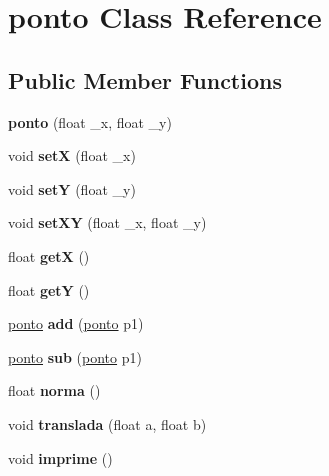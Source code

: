 \hypertarget{classponto}{}\section{ponto Class Reference}
\label{classponto}
\subsection*{Public Member Functions}
\begin{DoxyCompactItemize}
\item 
\mbox{\label{classponto_a6d6d40e6c14e903c65c48988b65fb649}} 
{\bfseries ponto} (float \+\_\+x, float \+\_\+y)
\item 
\mbox{\label{classponto_a64ff8ce435f3626995f535671a21403d}} 
void {\bfseries setX} (float \+\_\+x)
\item 
\mbox{\label{classponto_acf9918cb8a31b1f74e7425acee366322}} 
void {\bfseries setY} (float \+\_\+y)
\item 
\mbox{\label{classponto_a29ac118d16c126d9d13ae8daff2f13cf}} 
void {\bfseries set\+XY} (float \+\_\+x, float \+\_\+y)
\item 
\mbox{\label{classponto_a72028c7500c56c02b7574ca2cff8a6b2}} 
float {\bfseries getX} ()
\item 
\mbox{\label{classponto_a880c3bd815e15edd0130c77d33a57c7c}} 
float {\bfseries getY} ()
\item 
\mbox{\label{classponto_abbb3e8c2c0c74fba6c52e1b2c5ebfb76}} 
\hyperlink{classponto}{ponto} {\bfseries add} (\hyperlink{classponto}{ponto} p1)
\item 
\mbox{\label{classponto_ac2e219ffd3a478a4326792452c0af734}} 
\hyperlink{classponto}{ponto} {\bfseries sub} (\hyperlink{classponto}{ponto} p1)
\item 
\mbox{\label{classponto_ab0c5fb0ddcd79fdb70fefe4cb6d7360e}} 
float {\bfseries norma} ()
\item 
\mbox{\label{classponto_a57873357b3df1ba47a54119d9a044a8e}} 
void {\bfseries translada} (float a, float b)
\item 
\mbox{\label{classponto_adf55fab25fa59c8a688eb1a1011eb2ae}} 
void {\bfseries imprime} ()
\end{DoxyCompactItemize}
